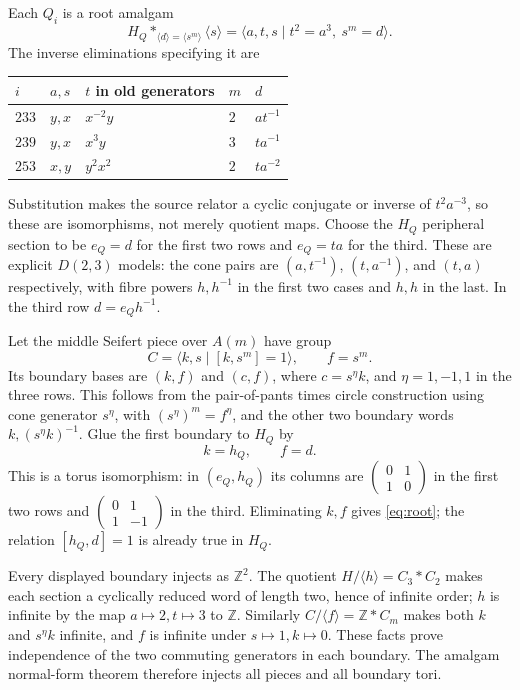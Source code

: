 \documentclass[11pt]{article}
\begin{document}
Each $Q_i$ is a root amalgam
\begin{equation}\label{eq:root}
 H_Q*_{\langle d\rangle=\langle s^m\rangle}\langle s\rangle
 =\langle a,t,s\mid t^2=a^3,\ s^m=d\rangle.
\end{equation}
The inverse eliminations specifying it are
\begin{center}
\begin{tabular}{lllll}
\toprule
$i$ & $a,s$ & $t$ in old generators & $m$ & $d$\\
\midrule
$233$ & $y,x$ & $x^{-2}y$ & $2$ & $at^{-1}$\\
$239$ & $y,x$ & $x^3y$ & $3$ & $ta^{-1}$\\
$253$ & $x,y$ & $y^2x^2$ & $2$ & $ta^{-2}$\\
\bottomrule
\end{tabular}
\end{center}
Substitution makes the source relator a cyclic conjugate or inverse of
$t^2a^{-3}$, so these are isomorphisms, not merely quotient maps.
Choose the $H_Q$ peripheral section to be $e_Q=d$ for the first two
rows and $e_Q=ta$ for the third. These are explicit $D(2,3)$ models:
the cone pairs are $(a,t^{-1})$, $(t,a^{-1})$, and $(t,a)$ respectively,
with fibre powers $h,h^{-1}$ in the first two cases and $h,h$ in the
last. In the third row $d=e_Qh^{-1}$.

Let the middle Seifert piece over $A(m)$ have group
\[
 C=\langle k,s\mid[k,s^m]=1\rangle,\qquad f=s^m.
\]
Its boundary bases are $(k,f)$ and $(c,f)$, where
$c=s^\eta k$, and $\eta=1,-1,1$ in the three rows.
This follows from the pair-of-pants times circle construction using
cone generator $s^\eta$, with $(s^\eta)^m=f^\eta$, and the other two
boundary words $k,(s^\eta k)^{-1}$.
Glue the first boundary to $H_Q$ by
\[
 k=h_Q,\qquad f=d.
\]
This is a torus isomorphism: in $(e_Q,h_Q)$ its columns are
$\left(\begin{smallmatrix}0&1\\1&0\end{smallmatrix}\right)$ in the
first two rows and
$\left(\begin{smallmatrix}0&1\\1&-1\end{smallmatrix}\right)$ in the
third. Eliminating $k,f$ gives \eqref{eq:root}; the relation
$[h_Q,d]=1$ is already true in $H_Q$.

Every displayed boundary injects as $\mathbb Z^2$.
The quotient $H/\langle h\rangle=C_3*C_2$ makes each section a
cyclically reduced word of length two, hence of infinite order; $h$
is infinite by the map $a\mapsto2,t\mapsto3$ to $\mathbb Z$.
Similarly $C/\langle f\rangle=\mathbb Z*C_m$ makes both $k$ and
$s^\eta k$ infinite, and $f$ is infinite under $s\mapsto1,k\mapsto0$.
These facts prove independence of the two commuting generators in each
boundary. The amalgam normal-form theorem therefore injects all pieces
and all boundary tori.
\end{document}
